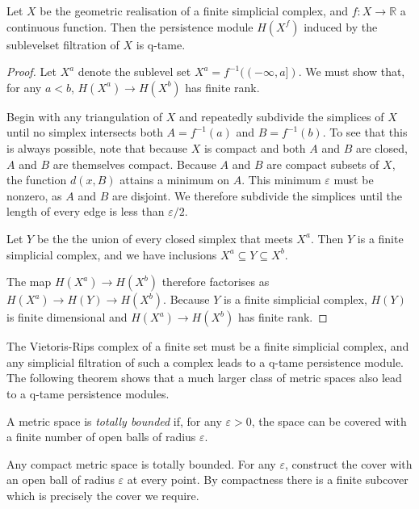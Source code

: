 \begin{theorem}
\label{thm-simplicial-qtame}
Let $X$ be the geometric realisation of a finite simplicial complex, and $f : X \to \mathbb{R}$ a continuous function. Then the persistence module $H(X^f)$ induced by the sublevelset filtration of $X$ is q-tame.
\end{theorem}
\begin{proof}
Let $X^a$ denote the sublevel set $X^a = f^{-1}((-\infty, a])$. We must show that, for any $a < b$, $H(X^a) \to H(X^b)$ has finite rank.

Begin with any triangulation of $X$ and repeatedly subdivide the simplices of $X$ until no simplex intersects both $A = f^{-1}(a)$ and $B = f^{-1}(b)$. To see that this is always possible, note that because $X$ is compact and both $A$ and $B$ are closed, $A$ and $B$ are themselves compact. Because $A$ and $B$ are compact subsets of $X$, the function $d(x, B)$ attains a minimum on $A$. This minimum $\varepsilon$ must be nonzero, as $A$ and $B$ are disjoint. We therefore subdivide the simplices until the length of every edge is less than $\varepsilon/2$.

Let $Y$ be the the union of every closed simplex that meets $X^a$. Then $Y$ is a finite simplicial complex, and we have inclusions $X^a \subseteq Y \subseteq X^b$. 

The map $H(X^a) \to H(X^b)$ therefore factorises as $H(X^a) \to H(Y) \to H(X^b)$. Because $Y$ is a finite simplicial complex, $H(Y)$ is finite dimensional and $H(X^a) \to H(X^b)$ has finite rank.
\end{proof}

The Vietoris-Rips complex of a finite set must be a finite simplicial complex, and any simplicial filtration of such a complex leads to a q-tame persistence module. The following theorem shows that a much larger class of metric spaces also lead to a q-tame persistence modules. \cite{chazal2013geometric}

\begin{definition}
A metric space is \emph{totally bounded} if, for any $\varepsilon > 0$, the space can be covered with a finite number of open balls of radius $\varepsilon$.
\end{definition}

Any compact metric space is totally bounded. For any $\varepsilon$, construct the cover with an open ball of radius $\varepsilon$ at every point. By compactness there is a finite subcover which is precisely the cover we require.

